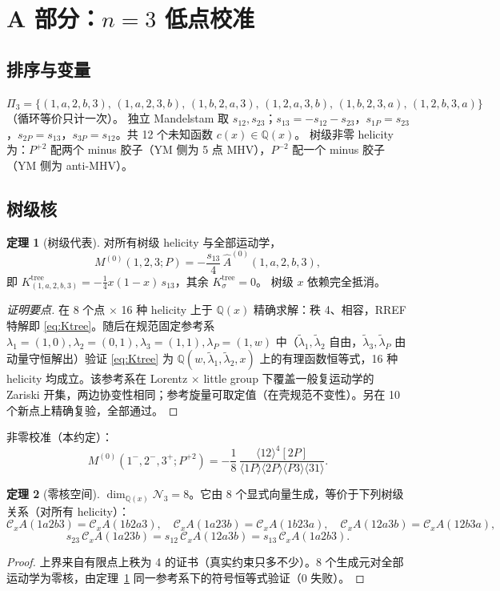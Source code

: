\documentclass[11pt,a4paper]{ctexart}
\newcommand{\ang}[1]{\langle #1\rangle}
\newcommand{\sq}[1]{[#1]}
\newcommand{\Cx}{\mathcal C_x}
\newcommand{\N}{\mathcal N}
\newcommand{\Q}{\mathbb Q}
\newcommand{\hA}{\widehat A}
\newcommand{\Ktree}{K^{\mathrm{tree}}}
\newcommand{\stat}[2]{\tcbox[on line,colback=#1!10,colframe=#1!70!black,boxrule=0.4pt,arc=1.5pt,
  left=2pt,right=2pt,top=0.6pt,bottom=0.6pt,boxsep=0pt,fontupper=\small\bfseries\color{#1!70!black}]{#2}}
\newcommand{\Proved}{\stat{ForestGreen}{已经证明}}
\theoremstyle{definition}
\newtheorem{theorem}{定理}
\theoremstyle{remark}
\begin{document}
\section{\texorpdfstring{A 部分：$n=3$ 低点校准}{A 部分：n=3 低点校准}}
\subsection{排序与变量}
$\Pi_3=\{(1,a,2,b,3),\,(1,a,2,3,b),\,(1,b,2,a,3),\,(1,2,a,3,b),\,(1,b,2,3,a),\,(1,2,b,3,a)\}$（循环等价只计一次）。
独立 Mandelstam 取 $s_{12},s_{23}$；$s_{13}=-s_{12}-s_{23}$，$s_{1P}=s_{23}$，$s_{2P}=s_{13}$，$s_{3P}=s_{12}$。共 12 个未知函数 $c(x)\in\Q(x)$。
树级非零 helicity 为：$P^{+2}$ 配两个 minus 胶子（YM 侧为 5 点 MHV），$P^{-2}$ 配一个 minus 胶子（YM 侧为 anti-MHV）。

\subsection{树级核}
\begin{theorem}[树级代表]\label{thm:tree}
对所有树级 helicity 与全部运动学，
\begin{equation}\label{eq:Ktree}
M^{(0)}(1,2,3;P)=-\frac{s_{13}}4\,\hA^{(0)}(1,a,2,b,3),
\end{equation}
即 $\Ktree_{(1,a,2,b,3)}=-\tfrac14x(1-x)\,s_{13}$，其余 $\Ktree_\sigma=0$。
树级 $x$ 依赖完全抵消。\hfill\Proved
\end{theorem}
\begin{proof}[证明要点]
在 8 个点 $\times$ 16 种 helicity 上于 $\Q(x)$ 精确求解：秩 4、相容，RREF 特解即 \eqref{eq:Ktree}。随后在规范固定参考系 $\lambda_1=(1,0),\lambda_2=(0,1),\lambda_3=(1,1),\lambda_P=(1,w)$ 中（$\tilde\lambda_1,\tilde\lambda_2$ 自由，$\tilde\lambda_3,\tilde\lambda_P$ 由动量守恒解出）验证 \eqref{eq:Ktree} 为 $\Q(w,\tilde\lambda_1,\tilde\lambda_2,x)$ 上的有理函数恒等式，16 种 helicity 均成立。该参考系在 Lorentz $\times$ little group 下覆盖一般复运动学的 Zariski 开集，两边协变性相同；参考旋量可取定值（在壳规范不变性）。另在 10 个新点上精确复验，全部通过。
\end{proof}
非零校准（本约定）：
\begin{equation}
M^{(0)}(1^-,2^-,3^+;P^{+2})=-\frac18\,\frac{\ang{12}^4\sq{2P}}{\ang{1P}\ang{2P}\ang{P3}\ang{31}} .
\end{equation}

\begin{theorem}[零核空间]\label{thm:null}
$\dim_{\Q(x)}\N_3=8$。它由 8 个显式向量生成，等价于下列树级关系（对所有 helicity）：
\[
\Cx A(1a2b3)=\Cx A(1b2a3),\quad \Cx A(1a23b)=\Cx A(1b23a),\quad \Cx A(12a3b)=\Cx A(12b3a),
\]
\[
s_{23}\,\Cx A(1a23b)=s_{12}\,\Cx A(12a3b)=s_{13}\,\Cx A(1a2b3).
\]
\hfill\Proved
\end{theorem}
\begin{proof}
上界来自有限点上秩为 4 的证书（真实约束只多不少）。8 个生成元对全部运动学为零核，由定理~\ref{thm:tree} 同一参考系下的符号恒等式验证（0 失败）。
\end{proof}
\end{document}
